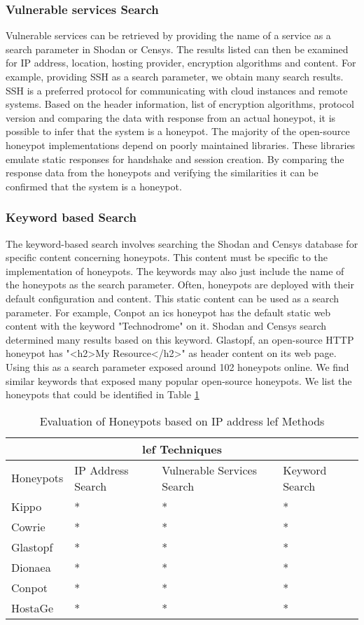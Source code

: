  \subsubsection{Vulnerable services Search}
 Vulnerable services can be retrieved by providing the name of a service as a search parameter in Shodan or Censys. The results listed can then be examined for IP address, location, hosting provider, encryption algorithms and content. For example, providing SSH as a search parameter, we obtain many search results. SSH is a preferred protocol for communicating with cloud instances and remote systems. Based on the header information, list of encryption algorithms, protocol version and comparing the data with response from an actual honeypot, it is possible to infer that the system is a honeypot. The majority of the open-source honeypot implementations depend on poorly maintained libraries. These libraries emulate static responses for handshake and session creation. By comparing the response data from the honeypots and verifying the similarities it can be confirmed that the system is a honeypot. 
 
 \subsubsection{Keyword based Search}
The keyword-based search involves searching the Shodan and Censys database for specific content concerning honeypots. This content must be specific to the implementation of honeypots. The keywords may also just include the name of the honeypots as the search parameter. Often, honeypots are deployed with their default configuration and content. This static content can be used as a search parameter. For example, Conpot an \acrshort{ics} honeypot has the default static web content with the keyword "Technodrome" on it. Shodan and Censys search determined many results based on this keyword. Glastopf, an open-source HTTP honeypot has "<h2>My Resource</h2>" as header content on its web page. Using this as a search parameter exposed around 102 honeypots online. We find similar keywords that exposed many popular open-source honeypots. We list the honeypots that could be identified in Table \ref{Tab:IP address}

 \begin{table}[]
 \begin{tabular}{ |p{1.5cm}||p{1.5cm}||p{1.2cm}|p{1.4cm}| }
 \hline
 \multicolumn{4}{|c|}{\acrfull{lef} Techniques} \\
 \hline
 Honeypots & IP Address Search & Vulnerable Services Search & Keyword Search \\
 \hline
 Kippo   & *  &* & *  \\
 Cowrie  & *  &* & *  \\
 Glastopf& *  &* & *  \\
 Dionaea & *  &* & *  \\
 Conpot  & *  &* & *  \\
 HostaGe & *  &*  &  *  \\
 \hline
\end{tabular}
 \caption{Evaluation of Honeypots based on IP address \acrfull{lef} Methods}
 \label{Tab:IP address}
 \end{table}


